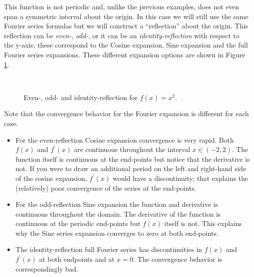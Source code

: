 This function is not periodic and, unlike the previous examples, does not even span a symmetric interval about the origin.  In this case we will still use the same Fourier series formulas but we will construct a ``reflection'' about the origin.  This reflection can be \emph{even-}, \emph{odd-}, or it can be an \emph{identity-reflection} with respect to the y-axis; these correspond to the Cosine expansion, Sine expansion and the full Fourier series expansions.  These different expansion options are shown in Figure \ref{fig:lec17-ex3}.

\begin{figure}
 \\
\begin{center}
\end{center}
\label{fig:lec17-ex3}
\caption{Even-, odd- and identity-reflection for $f(x)=x^2$.}
\end{figure}

Note that the convergence behavior for the Fourier expansion is different for each case.
\begin{itemize}
\item For the even-reflection Cosine expansion convergence is very rapid.  Both $f(x)$ and $f^{\prime}(x)$ are continuous throughout the interval $x\in (-2,2)$.  The function itself is continuous at the end-points but notice that the derivative is not.  If you were to draw an additional period on the left and right-hand side of the cosine expansion, $f^{\prime}(x)$ would have a discontinuity; that explains the (relatively) poor convergence of the series at the end-points.
\item For the odd-reflection Sine expansion the function and derivative is continuous throughout the domain.  The derivative of the function is continuous at the periodic end-points but $f(x)$ itself is not.  This explains why the Sine series expansion converges to zero at both end-points.  
\item The identity-reflection full Fourier series has discontinuities in $f(x)$ and $f^{\prime}(x)$ at both endpoints and at $x=0$.  The convergence behavior is correspondingly bad.
\end{itemize}

